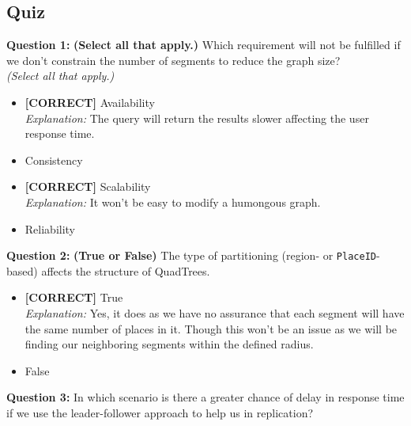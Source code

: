 

\subsection*{Quiz}
\vspace{0.3cm}
\noindent
\textbf{Question 1:} \textbf{(Select all that apply.)} Which requirement will not be fulfilled if we don't constrain the number of segments to reduce the graph size?
\\
\textit{(Select all that apply.)}
\\[0.2cm]
\begin{itemize}
 \item \textbf{[CORRECT]} Availability
\\[0.1cm]
\textit{Explanation:} 
The query will return the results slower affecting the user response time.
 \item Consistency
 \item \textbf{[CORRECT]} Scalability
\\[0.1cm]
\textit{Explanation:} 
It won't be easy to modify a humongous graph.
 \item Reliability
\end{itemize}
\vspace{0.3cm}
\noindent
\textbf{Question 2:} \textbf{(True or False)} The type of partitioning (region- or \texttt{PlaceID}-based) affects the structure of QuadTrees.
\\[0.2cm]
\begin{itemize}
 \item \textbf{[CORRECT]} True
\\[0.1cm]
\textit{Explanation:} 
Yes, it does as we have no assurance that each segment will have the same number of places in it. Though this won't be an issue as we will be finding our neighboring segments within the defined radius.
 \item False
\end{itemize}
\vspace{0.3cm}
\noindent
\textbf{Question 3:} In which scenario is there a greater chance of delay in response time if we use the leader-follower approach to help us in replication?
\\[0.2cm]
